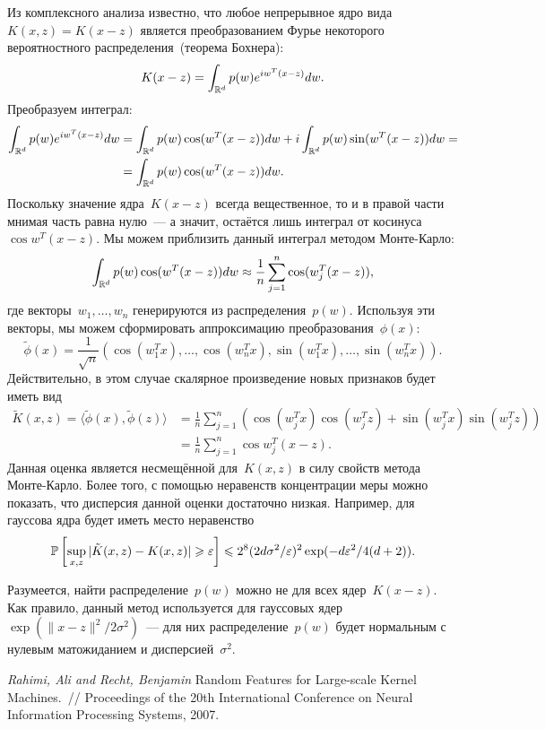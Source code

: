 \documentclass[12pt,fleqn]{article}
\begin{document}
Из комплексного анализа известно, что любое непрерывное ядро вида~$K(x, z) = K(x - z)$
является преобразованием Фурье некоторого вероятностного распределения~(теорема Бохнера):
\[
    K(x - z)
    =
    \int_{\mathbb{R}^d}
        p(w)
        e^{i w^T (x - z)}
    dw.
\]
Преобразуем интеграл:
\begin{align*}
    \int_{\mathbb{R}^d}
        p(w)
        e^{i w^T (x - z)}
    dw
    &=
    \int_{\mathbb{R}^d}
        p(w)
        \cos(w^T (x - z))
    dw
    +
    i
    \int_{\mathbb{R}^d}
        p(w)
        \sin(w^T (x - z))
    dw
    =\\
    &=
    \int_{\mathbb{R}^d}
        p(w)
        \cos(w^T (x - z))
    dw.
\end{align*}
Поскольку значение ядра~$K(x - z)$ всегда вещественное,
то и в правой части мнимая часть равна нулю~---
а значит, остаётся лишь интеграл от косинуса~$\cos w^T (x - z)$.
Мы можем приблизить данный интеграл методом Монте-Карло:
\[
    \int_{\mathbb{R}^d}
        p(w)
        \cos(w^T (x - z))
    dw
    \approx
    \frac{1}{n}
    \sum_{j = 1}^{n}
        \cos(w_j^T (x - z)),
\]
где векторы~$w_1, \dots, w_n$ генерируются из распределения~$p(w)$.
Используя эти векторы, мы можем сформировать аппроксимацию преобразования~$\phi(x)$:
\[
    \tilde \phi(x)
    =
    \frac{1}{\sqrt{n}}
    (\cos(w_1^T x), \dots, \cos(w_n^T x),
    \sin(w_1^T x), \dots, \sin(w_n^T x)).
\]
Действительно, в этом случае скалярное произведение новых признаков будет иметь вид
\begin{align*}
    \tilde K(x, z)
    =
    \langle \tilde \phi(x), \tilde \phi(z) \rangle
    &=
    \frac{1}{n}
    \sum_{j = 1}^{n} \left(
        \cos(w_j^T x) \cos(w_j^T z)
        +
        \sin(w_j^T x) \sin(w_j^T z)
    \right)\\
    &=
    \frac{1}{n}
    \sum_{j = 1}^{n}
        \cos w_j^T (x - z).
\end{align*}
Данная оценка является несмещённой для~$K(x, z)$ в силу свойств метода Монте-Карло.
Более того, с помощью неравенств концентрации меры можно показать, что дисперсия данной оценки достаточно низкая.
Например, для гауссова ядра будет иметь место неравенство
\[
    \mathbb{P}
    \left[
        \sup_{x, z}
        | \tilde K(x, z) - K(x, z) |
        \geqslant
        \varepsilon
    \right]
    \leqslant
    2^8
    (2 d \sigma^2 / \varepsilon)^2
    \exp(-d \varepsilon^2 / 4(d + 2)).
\]

Разумеется, найти распределение~$p(w)$ можно не для всех ядер~$K(x - z)$.
Как правило, данный метод используется для гауссовых ядер~$\exp(\|x - z\|^2 / 2 \sigma^2)$~---
для них распределение~$p(w)$ будет нормальным  с нулевым матожиданием и дисперсией~$\sigma^2$.


\begin{thebibliography}{1}
    \emph{Rahimi, Ali and Recht, Benjamin}
    Random Features for Large-scale Kernel Machines.~//
    Proceedings of the 20th International Conference on Neural Information Processing Systems,
    2007.
\end{thebibliography}
\end{document}
